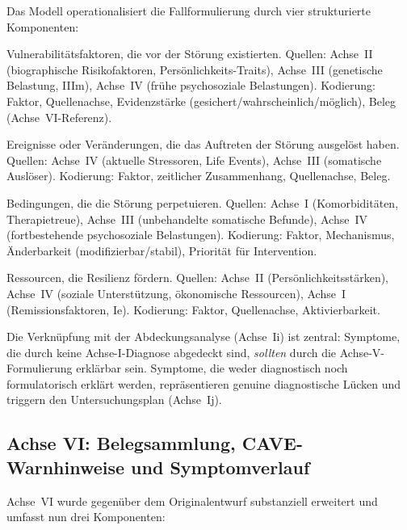 \documentclass[11pt,a4paper]{article}
\begin{document}
Das Modell operationalisiert die Fallformulierung durch vier strukturierte Komponenten:

\begin{description}[style=nextline, leftmargin=1.5cm, font=\bfseries]
\item[Pr\"adisponierende Faktoren (P1)] Vulnerabilit\"atsfaktoren, die vor der St\"orung existierten. Quellen: Achse~II (biographische Risikofaktoren, Pers\"onlichkeits-Traits), Achse~III (genetische Belastung, IIIm), Achse~IV (fr\"uhe psychosoziale Belastungen). Kodierung: Faktor, Quellenachse, Evidenzst\"arke (gesichert/wahrscheinlich/m\"oglich), Beleg (Achse~VI-Referenz).
\item[Ausl\"osende Faktoren (P2)] Ereignisse oder Ver\"anderungen, die das Auftreten der St\"orung ausgelöst haben. Quellen: Achse~IV (aktuelle Stressoren, Life Events), Achse~III (somatische Ausl\"oser). Kodierung: Faktor, zeitlicher Zusammenhang, Quellenachse, Beleg.
\item[Aufrechterhaltende Faktoren (P3)] Bedingungen, die die St\"orung perpetuieren. Quellen: Achse~I (Komorbidit\"aten, Therapietreue), Achse~III (unbehandelte somatische Befunde), Achse~IV (fortbestehende psychosoziale Belastungen). Kodierung: Faktor, Mechanismus, \"Anderbarkeit (modifizierbar/stabil), Priorit\"at f\"ur Intervention.
\item[Protektive Faktoren (P4)] Ressourcen, die Resilienz f\"ordern. Quellen: Achse~II (Pers\"onlichkeitsst\"arken), Achse~IV (soziale Unterst\"utzung, \"okonomische Ressourcen), Achse~I (Remissionsfaktoren, Ie). Kodierung: Faktor, Quellenachse, Aktivierbarkeit.
\end{description}

Die Verkn\"upfung mit der Abdeckungsanalyse (Achse~Ii) ist zentral: Symptome, die durch keine Achse-I-Diagnose abgedeckt sind, \textit{sollten} durch die Achse-V-Formulierung erkl\"arbar sein. Symptome, die weder diagnostisch noch formulatorisch erkl\"art werden, repr\"asentieren genuine diagnostische L\"ucken und triggern den Untersuchungsplan (Achse~Ij).

\subsection{Achse VI: Belegsammlung, CAVE-Warnhinweise und Symptomverlauf}

Achse~VI wurde gegen\"uber dem Originalentwurf substanziell erweitert und umfasst nun drei Komponenten:
\end{document}
